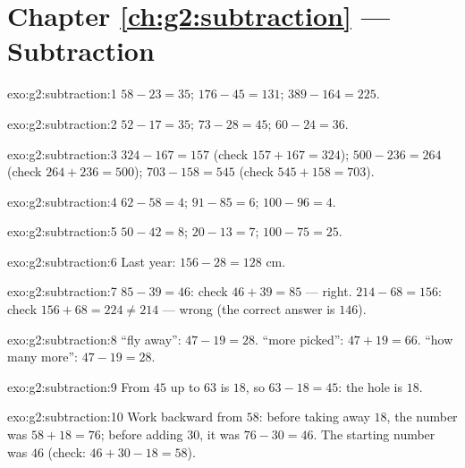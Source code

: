 \section*{Chapter \ref{ch:g2:subtraction} --- Subtraction}

\begin{solution}{exo:g2:subtraction:1}
$58 - 23 = 35$; \quad $176 - 45 = 131$; \quad $389 - 164 = 225$.
\end{solution}

\begin{solution}{exo:g2:subtraction:2}
$52 - 17 = 35$; \quad $73 - 28 = 45$; \quad $60 - 24 = 36$.
\end{solution}

\begin{solution}{exo:g2:subtraction:3}
$324 - 167 = 157$ (check $157 + 167 = 324$); \quad
$500 - 236 = 264$ (check $264 + 236 = 500$); \quad
$703 - 158 = 545$ (check $545 + 158 = 703$).
\end{solution}

\begin{solution}{exo:g2:subtraction:4}
$62 - 58 = 4$; \quad $91 - 85 = 6$; \quad $100 - 96 = 4$.
\end{solution}

\begin{solution}{exo:g2:subtraction:5}
$50 - 42 = 8$; \quad $20 - 13 = 7$; \quad $100 - 75 = 25$.
\end{solution}

\begin{solution}{exo:g2:subtraction:6}
Last year: $156 - 28 = 128$ cm.
\end{solution}

\begin{solution}{exo:g2:subtraction:7}
$85 - 39 = 46$: check $46 + 39 = 85$ --- right.
$214 - 68 = 156$: check $156 + 68 = 224 \neq 214$ --- wrong (the
correct answer is $146$).
\end{solution}

\begin{solution}{exo:g2:subtraction:8}
``fly away'': $47 - 19 = 28$. ``more picked'': $47 + 19 = 66$.
``how many more'': $47 - 19 = 28$.
\end{solution}

\begin{solution}{exo:g2:subtraction:9}
From $45$ up to $63$ is $18$, so $63 - 18 = 45$: the hole is $18$.
\end{solution}

\begin{solution}{exo:g2:subtraction:10}
Work backward from $58$: before taking away $18$, the number was
$58 + 18 = 76$; before adding $30$, it was $76 - 30 = 46$. The
starting number was $46$ (check: $46 + 30 - 18 = 58$).
\end{solution}
